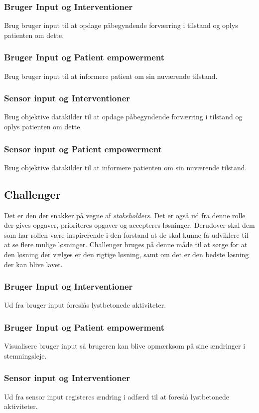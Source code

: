\subsubsection*{Bruger Input og Interventioner}
Brug bruger input til at opdage påbegyndende forværring i tilstand og oplys patienten om dette.
\subsubsection*{Bruger Input og Patient empowerment}
Brug bruger input til at informere patient om sin nuværende tilstand.
\subsubsection*{Sensor input og Interventioner}
Brug objektive datakilder til at opdage påbegyndende forværring i tilstand og oplys patienten om dette. 
\subsubsection*{Sensor input og Patient empowerment}
Brug objektive datakilder til at informere patienten om sin nuværende tilstand.

\subsection{Challenger}
Det er den der snakker på vegne af \textit{stakeholders}.
Det er også ud fra denne rolle der gives opgaver, prioriteres opgaver og accepteres løsninger.
Derudover skal dem som har rollen være inspirerende i den forstand at de skal kunne få udviklere til at se flere mulige løsninger. 
Challenger bruges på denne måde til at sørge for at den løsning der vælges er den rigtige løsning, samt om det er den bedste løsning der kan blive lavet.

\subsubsection*{Bruger Input og Interventioner}
Ud fra bruger input foreslås lystbetonede aktiviteter.
\subsubsection*{Bruger Input og Patient empowerment}
Visualisere bruger input så brugeren kan blive opmærksom på sine ændringer i stemningsleje.

\subsubsection*{Sensor input og Interventioner} 
Ud fra sensor input registeres ændring i adfærd til at foreslå lystbetonede aktiviteter.


